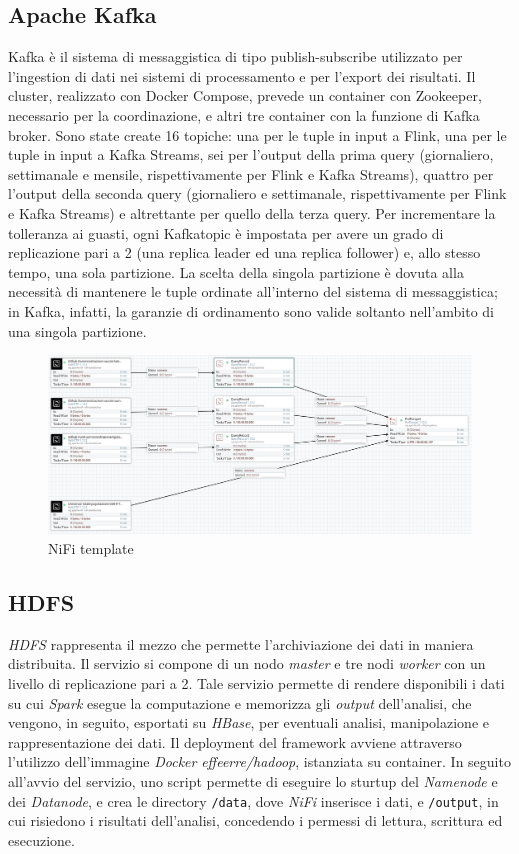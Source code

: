 \documentclass[conference]{IEEEtran}
\begin{document}
\subsection*{\textbf{Apache Kafka}}
Kafka è il sistema di messaggistica di tipo ​publish-subscribe
utilizzato per l'ingestion di dati nei sistemi di processamento
e per l'export dei risultati. Il ​cluster, realizzato con Docker
Compose, prevede un​ container con Zookeeper, necessario
per la coordinazione, e altri tre​ container con la funzione di
Kafka broker. Sono state create 16 topiche: una per le tuple
in input a Flink, una per le tuple in input a Kafka Streams,
sei per l'output della prima query (giornaliero, settimanale e
mensile, rispettivamente per Flink e Kafka Streams), quattro
per l'output della seconda ​query (giornaliero e settimanale,
rispettivamente per Flink e Kafka Streams) e altrettante per
quello della terza query. Per incrementare la tolleranza ai
guasti, ogni Kafka ​topic è impostata per avere un grado di
replicazione pari a 2 (una replica ​leader ed una replica
follower) e, allo stesso tempo, una sola partizione. La scelta
della singola partizione è dovuta alla necessità di
mantenere le tuple ordinate all’interno del sistema di
messaggistica; in Kafka, infatti, la garanzie di ordinamento
sono valide soltanto nell’ambito di una singola partizione.
\begin{figure}[htbp]
\includegraphics[scale=0.16]{Screenshot/Nifi.png}
\caption{NiFi template}\label{figura:template}
\label{fig}
\end{figure}

\subsection*{\textbf{HDFS}}
\emph{HDFS} rappresenta il mezzo che permette l'archiviazione dei dati in maniera distribuita. Il servizio si compone di un nodo \emph{master} e tre nodi \emph{worker} con un livello di replicazione pari a 2. Tale servizio permette di rendere disponibili i dati su cui \emph{Spark} esegue la computazione e memorizza gli \emph{output} dell'analisi, che vengono, in seguito, esportati su \emph{HBase}, per eventuali analisi, manipolazione e rappresentazione dei dati. Il deployment del framework avviene attraverso l'utilizzo dell'immagine \emph{Docker} \emph{effeerre/hadoop}, istanziata su container. In seguito all'avvio del servizio, uno script permette di eseguire lo sturtup del \emph{Namenode} e dei \emph{Datanode}, e crea le directory \texttt{/data}, dove \emph{NiFi} inserisce i dati, e \texttt{/output}, in cui risiedono i risultati dell'analisi, concedendo i permessi di lettura, scrittura ed esecuzione.
\end{document}
